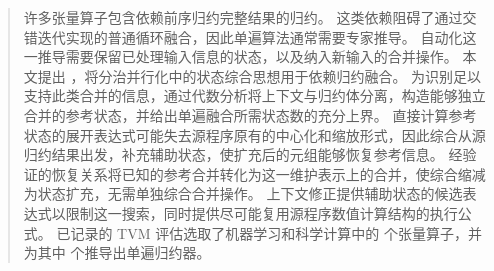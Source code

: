 \begin{abstract}
许多张量算子包含依赖前序归约完整结果的归约。
这类依赖阻碍了通过交错迭代实现的普通循环融合，因此单遍算法通常需要专家推导。
自动化这一推导需要保留已处理输入信息的状态，以及纳入新输入的合并操作。
本文提出 \sys，将分治并行化中的状态综合思想用于依赖归约融合。
为识别足以支持此类合并的信息，\sys 通过代数分析将上下文与归约体分离，构造能够独立合并的参考状态，并给出单遍融合所需状态数的充分上界。
直接计算参考状态的展开表达式可能失去源程序原有的中心化和缩放形式，因此综合从源归约结果出发，补充辅助状态，使扩充后的元组能够恢复参考信息。
经验证的恢复关系将已知的参考合并转化为这一维护表示上的合并，使综合缩减为状态扩充，无需单独综合合并操作。
上下文修正提供辅助状态的候选表达式以限制这一搜索，同时提供尽可能复用源程序数值计算结构的执行公式。
已记录的 TVM 评估选取了机器学习和科学计算中的 \nShowcase 个张量算子，并为其中 \nShowFused 个推导出单遍归约器。
\end{abstract}
